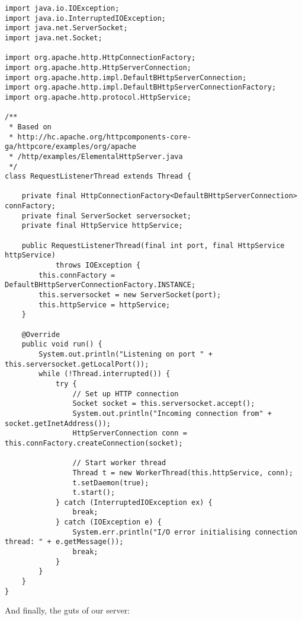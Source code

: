 \begin{lstlisting}
import java.io.IOException;
import java.io.InterruptedIOException;
import java.net.ServerSocket;
import java.net.Socket;

import org.apache.http.HttpConnectionFactory;
import org.apache.http.HttpServerConnection;
import org.apache.http.impl.DefaultBHttpServerConnection;
import org.apache.http.impl.DefaultBHttpServerConnectionFactory;
import org.apache.http.protocol.HttpService;

/**
 * Based on
 * http://hc.apache.org/httpcomponents-core-ga/httpcore/examples/org/apache
 * /http/examples/ElementalHttpServer.java
 */
class RequestListenerThread extends Thread {

	private final HttpConnectionFactory<DefaultBHttpServerConnection> connFactory;
	private final ServerSocket serversocket;
	private final HttpService httpService;

	public RequestListenerThread(final int port, final HttpService httpService)
			throws IOException {
		this.connFactory = DefaultBHttpServerConnectionFactory.INSTANCE;
		this.serversocket = new ServerSocket(port);
		this.httpService = httpService;
	}

	@Override
	public void run() {
		System.out.println("Listening on port " + this.serversocket.getLocalPort());
		while (!Thread.interrupted()) {
			try {
				// Set up HTTP connection
				Socket socket = this.serversocket.accept();
				System.out.println("Incoming connection from" + socket.getInetAddress());
				HttpServerConnection conn = this.connFactory.createConnection(socket);

				// Start worker thread
				Thread t = new WorkerThread(this.httpService, conn);
				t.setDaemon(true);
				t.start();
			} catch (InterruptedIOException ex) {
				break;
			} catch (IOException e) {
				System.err.println("I/O error initialising connection thread: " + e.getMessage());
				break;
			}
		}
	}
}
\end{lstlisting}

\newpage
\noindent
And finally, the guts of our server:


